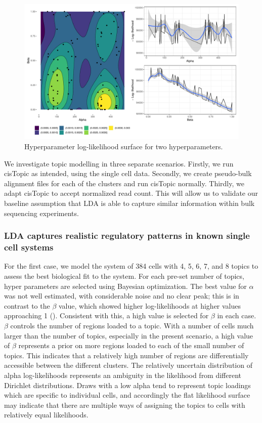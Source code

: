 \begin{figure}
  \centering
  \includegraphics[width=\textwidth]{plot/ch4/sim_ll_surface.pdf}
  \caption{Hyperparameter log-likelihood surface for two hyperparameters.}
  \label{fig:llhood_surfacea_simulation}
\end{figure}

We investigate topic modelling in three separate scenarios. Firstly, we run cisTopic as intended, using the single cell data. Secondly, we create pseudo-bulk alignment files for each of the clusters and run cisTopic normally. Thirdly, we adapt cisTopic to accept normalized read count. This will allow us to validate our baseline assumption that LDA is able to capture similar information within bulk sequencing experiments.

\subsubsection{LDA captures realistic regulatory patterns in known single cell systems} \label{ch4:sc}

For the first case, we model the system of 384 cells with 4, 5, 6, 7, and 8 topics to assess the best biological fit to the system. For each pre-set number of topics, hyper parameters are selected using Bayesian optimization. The best value for $\alpha$ was not well estimated, with considerable noise and no clear peak; this is in contrast to the $\beta$ value, which showed higher log-likelihoods at higher values approaching 1 (). Consistent with this, a high value is selected for $\beta$ in each case. $\beta$ controls the number of regions loaded to a topic. With a number of cells much larger than the number of topics, especially in the present scenario, a high value of $\beta$ represents a prior on more regions loaded to each of the small number of topics. This indicates that a relatively high number of regions are differentially accessible between the different clusters. The relatively uncertain distribution of alpha log-likelihoods represents an ambiguity in the likelihood from different Dirichlet distributions. Draws with a low alpha tend to represent topic loadings which are specific to individual cells, and accordingly the flat likelihood surface may indicate that there are multiple ways of assigning the topics to cells with relatively equal likelihoods.

